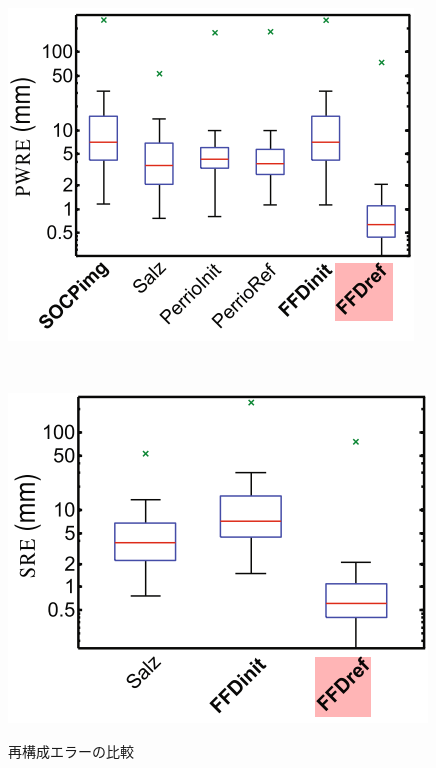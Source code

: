 \documentclass[10.5pt,twocolumn,a4j,fleqn]{ujarticle}
\begin{document}
\begin{figure}[htbp]
  \begin{minipage}[t]{\hsize}
    \centering
    \includegraphics[width=\linewidth]{img/fig3a.png}
    \label{fig3a}
  \end{minipage}
    \\
  \begin{minipage}[t]{\hsize}
    \centering
    \includegraphics[width=\linewidth]{img/fig3b.png}
    \label{fig3b}
  \end{minipage}
 \caption{再構成エラーの比較}
\end{figure}
\end{document}
